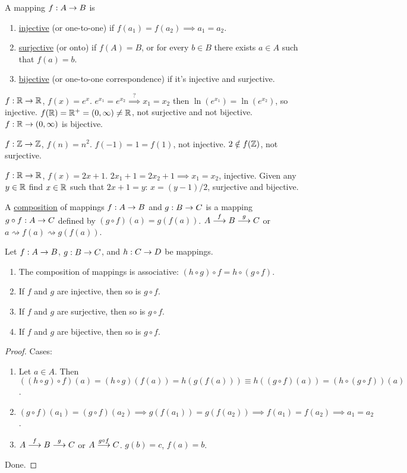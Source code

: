 \documentclass[]{article}
\begin{document}
\begin{definition}
	A mapping $f:A\rightarrow B$ is
	\begin{enumerate}
		\item \ul{injective} (or one-to-one) if $f(a_1) = f(a_2) \implies a_1 = a_2$.
		\item \ul{surjective} (or onto) if $f(A) = B$, or for every $b\in B$ there exists $a\in A$ such that $f(a) = b$.
		\item \ul{bijective} (or one-to-one correspondence) if it's injective and surjective.
	\end{enumerate}
\end{definition}
\begin{example}
	$f:\mathbb{R}\rightarrow \mathbb{R}$, $f(x) = e^x$. $e^{x_1} = e^{x_2} \overset{?}{\implies} x_1 = x_2$ then $\ln(e^{x_1}) = \ln(e^{x_2})$, so injective. $f(\mathbb{R}) = \mathbb{R}^+ = (0,\infty) \neq \mathbb{R}$, not surjective and not bijective.
	$f:\mathbb{R} \rightarrow (0,\infty)$ is bijective.
\end{example}
\begin{example}
	$f:\mathbb{Z}\rightarrow\mathbb{Z}$, $f(n) = n^2$. $f(-1) = 1 = f(1)$, not injective. $2\notin f(\mathbb{Z})$, not surjective.%
\end{example}
\begin{example}
	$f:\mathbb{R}\rightarrow \mathbb{R}$, $f(x) = 2x+1$. $2x_1 + 1 = 2x_2 + 1 \implies x_1 = x_2$, injective. Given any $y\in \mathbb{R}$ find $x\in \mathbb{R}$ such that $2x+1 = y$: $x = (y-1)/2$, surjective and bijective.
\end{example}

A \ul{composition} of mappings $f:A\rightarrow B$ and $g:B\rightarrow C$ is a mapping $g\circ f: A\rightarrow C$ defined by $(g\circ f)(a) = g(f(a))$. $A \overset{f}{\longrightarrow} B \overset{g}{\longrightarrow} C$ or $a \rightsquigarrow f(a) \rightsquigarrow g(f(a))$.
\begin{theorem}
	Let $f:A\rightarrow B$, $g:B\rightarrow C$, and $h:C\rightarrow D$ be mappings.
	\begin{enumerate}
		\item The composition of mappings is associative: $(h\circ g) \circ f = h\circ(g\circ f)$.
		\item If $f$ and $g$ are injective, then so is $g\circ f$.
		\item If $f$ and $g$ are surjective, then so is $g\circ f$.
		\item If $f$ and $g$ are bijective, then so is $g\circ f$.
	\end{enumerate}
\end{theorem}
\begin{proof}
	Cases:
	\begin{enumerate}
		\item Let $a\in A$. Then $((h\circ g)\circ f)(a) = (h\circ g)(f(a)) = h(g(f(a))) \equiv h((g\circ f)(a)) = (h\circ(g\circ f))(a)$.
		\item $(g\circ f)(a_1) = (g\circ f)(a_2) \implies g(f(a_1)) = g(f(a_2)) \implies f(a_1) = f(a_2) \implies a_1 = a_2$.
		\item $A\overset{f}{\longrightarrow} B \overset{g}{\longrightarrow} C$ or $A\overset{g\circ f}{\longrightarrow} C$. $g(b) = c$, $f(a) = b$.
	\end{enumerate}
	Done.
\end{proof}
\end{document}
